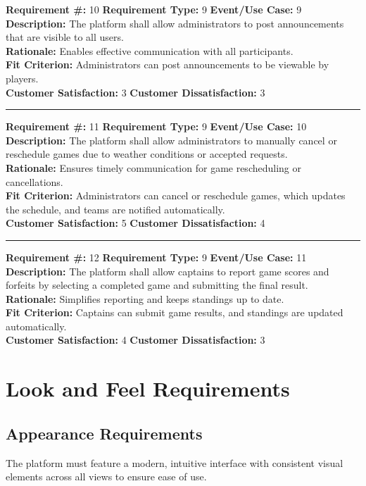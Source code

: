 \documentclass[12pt]{article}
\begin{document}
\textbf{Requirement \#:} 10 \quad \textbf{Requirement Type:} 9 \quad \textbf{Event/Use Case:} 9 \\
\textbf{Description:} The platform shall allow administrators to post announcements that are visible to all users.\\
\textbf{Rationale:} Enables effective communication with all participants.\\
\textbf{Fit Criterion:} Administrators can post announcements to be viewable by players.\\
\textbf{Customer Satisfaction:} 3 \quad\quad \textbf{Customer Dissatisfaction:} 3\\
\noindent\rule{\textwidth}{1pt}

\textbf{Requirement \#:} 11 \quad \textbf{Requirement Type:} 9 \quad \textbf{Event/Use Case:} 10 \\
\textbf{Description:} The platform shall allow administrators to manually cancel or reschedule games due to weather conditions or accepted requests.\\
\textbf{Rationale:} Ensures timely communication for game rescheduling or cancellations.\\
\textbf{Fit Criterion:} Administrators can cancel or reschedule games, which updates the schedule, and teams are notified automatically. \\
\textbf{Customer Satisfaction:} 5 \quad\quad \textbf{Customer Dissatisfaction:} 4\\
\noindent\rule{\textwidth}{1pt}

\textbf{Requirement \#:} 12 \quad \textbf{Requirement Type:} 9 \quad \textbf{Event/Use Case:} 11 \\
\textbf{Description:} The platform shall allow captains to report game scores and forfeits by selecting a completed game and submitting the final result.\\
\textbf{Rationale:} Simplifies reporting and keeps standings up to date.\\
\textbf{Fit Criterion:} Captains can submit game results, and standings are updated automatically. \\
\textbf{Customer Satisfaction:} 4 \quad\quad \textbf{Customer Dissatisfaction:} 3\\

\section{Look and Feel Requirements}
\subsection{Appearance Requirements}
The platform must feature a modern, intuitive interface with consistent visual elements across all views to ensure ease of use.
\end{document}
